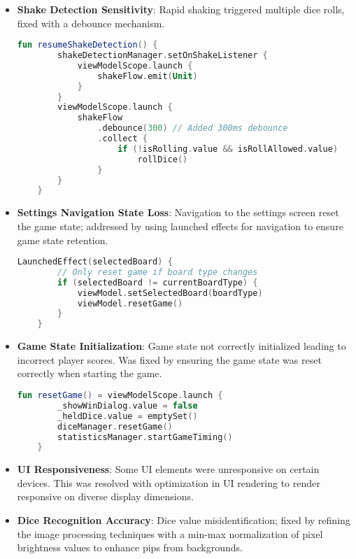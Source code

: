 \begin{itemize}

    \item \textbf{Shake Detection Sensitivity}: Rapid shaking triggered multiple dice rolls, fixed with a debounce mechanism.
    \begin{lstlisting}[language=Kotlin, caption=Fix for Shake Detection Sensitivity, label=lst:shake_detection_fix_code]
    fun resumeShakeDetection() {
        shakeDetectionManager.setOnShakeListener {
            viewModelScope.launch {
                shakeFlow.emit(Unit)
            }
        }
        viewModelScope.launch {
            shakeFlow
                .debounce(300) // Added 300ms debounce
                .collect {
                    if (!isRolling.value && isRollAllowed.value) 
                        rollDice()
                }
        }
    } 
    \end{lstlisting}

    \item \textbf{Settings Navigation State Loss}: Navigation to the settings screen reset the game state; addressed by using launched effects for navigation to ensure game state retention.
    \begin{lstlisting}[language=Kotlin, caption=Fix for Settings Navigation State Loss, label=lst:setting_navigation_fix_code]
    LaunchedEffect(selectedBoard) {
        // Only reset game if board type changes
        if (selectedBoard != currentBoardType) {
            viewModel.setSelectedBoard(boardType)
            viewModel.resetGame()
        }
    } 
    \end{lstlisting}

    \item \textbf{Game State Initialization}: Game state not correctly initialized leading to incorrect player scores. Was fixed by ensuring the game state was reset correctly when starting the game.
    \begin{lstlisting}[language=Kotlin, caption=Fix for Game State Initialization, label=lst:game_state_reset]
    fun resetGame() = viewModelScope.launch {
        _showWinDialog.value = false
        _heldDice.value = emptySet()
        diceManager.resetGame()
        statisticsManager.startGameTiming()
    } 
    \end{lstlisting}
    \item \textbf{UI Responsiveness}: Some UI elements were unresponsive on certain devices. This was resolved with optimization in UI rendering to render responsive on diverse display dimensions.
   
    \item \textbf{Dice Recognition Accuracy}: Dice value misidentification; fixed by refining the image processing techniques with a min-max normalization of pixel brightness values to enhance pips from backgrounds.
\end{itemize}

